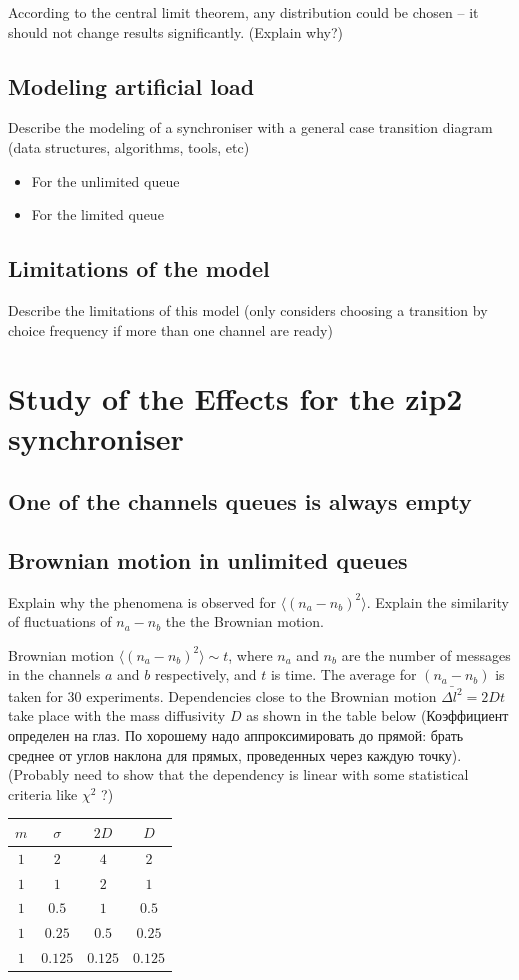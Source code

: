 According to the central limit theorem, any distribution could be chosen -- it should not change results significantly. (Explain why?)
  
  \subsection{Modeling artificial load}
Describe the modeling of a synchroniser with a general case transition diagram (data structures, algorithms, tools, etc)
    \begin{itemize}
    \item For the unlimited queue
    \item For the limited queue
    \end{itemize}

  \subsection{Limitations of the model}
Describe the limitations of this model (only considers choosing a transition by choice frequency if more than one channel are ready)


\section{Study of the Effects for the zip2 synchroniser}
  \subsection{One of the channels queues is always empty}
  \subsection{Brownian motion in unlimited queues}
Explain why the phenomena is observed for $\langle (n_{a} - n_{b})^{2} \rangle$. Explain the similarity of fluctuations of $n_{a} - n_{b}$ the the Brownian motion.

Brownian motion $\langle (n_{a} - n_{b})^{2} \rangle \sim t$, where $n_{a}$ and $n_{b}$ are the number of messages in the channels $a$ and $b$ respectively, and $t$ is time. The average for $(n_{a} - n_{b})$ is taken for 30 experiments. Dependencies close to the Brownian motion $\bar{\Delta l^2} = 2Dt$ take place with the mass diffusivity $D$ as shown in the table below (Коэффициент определен на глаз. По хорошему надо аппроксимировать до прямой: брать среднее от углов наклона для прямых, проведенных через каждую точку). (Probably need to show that the dependency is linear with some statistical criteria like $\chi^{2}$ ?)
  \begin{tabular}{c|c|c|c}
  $m$ & $\sigma$ & $2D$ & $D$\\
  \hline
  $1$ & $2$ & $4$ & $2$\\
  \hline
  $1$ & $1$ & $2$ & $1$\\
  \hline
  $1$ & $0.5$ & $1$ & $0.5$\\
  \hline
  $1$ & $0.25$ & $0.5$ & $0.25$\\
  \hline
  $1$ & $0.125$ & $0.125$ & $0.125$\\ 
  \end{tabular}

